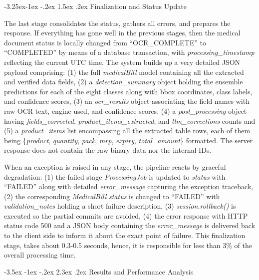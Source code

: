 \documentclass[conference,twocolumn]{IEEEtran}
\makeatletter
\renewcommand{\section}{\@startsection{section}{1}{\z@}%
  {-3.5ex \@plus -1ex \@minus -.2ex}%
  {2.3ex \@plus.2ex}%
  {\normalfont\large\bfseries\centering}}
\renewcommand{\subsection}{\@startsection{subsection}{2}{\z@}%
  {-3.25ex\@plus -1ex \@minus -.2ex}%
  {1.5ex \@plus .2ex}%
  {\normalfont\normalsize\bfseries\itshape}}
\makeatother
\begin{document}
\subsection{Finalization and Status Update}

The last stage consolidates the status, gathers all errors, and prepares the
response. If everything has gone well in the previous stages, then the
medical document status is locally changed from
``OCR\_COMPLETE'' to
``COMPLETED'' by means of a database
transaction, with \textit{processing\_timestamp} reflecting the current
UTC time. The system builds up a very detailed JSON payload comprising:
(1) the full \textit{medicalBill} model containing all the extracted and
verified data fields, (2) a \textit{detection\_summary} object holding the
ensemble predictions for each of the eight classes along with bbox
coordinates, class labels, and confidence scores, (3) an
\textit{ocr\_results} object associating the field names with raw OCR
text, engine used, and confidence scores, (4) a \textit{post\_processing}
object having \textit{fields\_corrected},
\textit{product\_items\_extracted}, and \textit{llm\_corrections} counts and
(5) a \textit{product\_items} list encompassing all the extracted table
rows, each of them being \{\textit{product}, \textit{quantity}, \textit{pack},
\textit{mrp}, \textit{expiry}, \textit{total\_amount}\} formatted. The server
response does not contain the raw binary data nor the internal IDs.

When an exception is raised in any stage, the pipeline reacts by
graceful degradation: (1) the failed stage \textit{ProcessingJob} is
updated to \textit{status} with ``FAILED''
along with detailed \textit{error\_message} capturing the exception
traceback, (2) the corresponding \textit{MedicalBill} \textit{status} is
changed to ``FAILED'' with
\textit{validation\_notes} holding a short failure description, (3)
\textit{session.rollback()} is executed so the partial commits are
avoided, (4) the error response with HTTP status code 500 and a JSON
body containing the \textit{error\_message} is delivered back to the
client side to inform it about the exact point of failure. This
finalization stage, takes about 0.3-0.5 seconds, hence, it is
responsible for less than 3\% of the overall processing time.

\section{Results and Performance Analysis}
\end{document}
